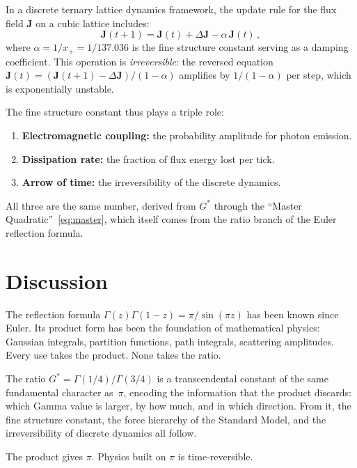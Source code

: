 \documentclass[12pt,reqno]{amsart}
\theoremstyle{definition}
\theoremstyle{remark}
\newcommand{\Gstar}{G^{\!*}}
\begin{document}
In a discrete ternary lattice dynamics framework, the update rule for the flux field $\mathbf{J}$ on a cubic lattice includes:
\begin{equation}
  \mathbf{J}(t+1) = \mathbf{J}(t) + \Delta\mathbf{J} - \alpha\,\mathbf{J}(t)\,,
\end{equation}
where $\alpha = 1/x_+ = 1/137.036$ is the fine structure constant serving as a damping coefficient. This operation is \emph{irreversible}: the reversed equation $\mathbf{J}(t) = (\mathbf{J}(t+1) - \Delta\mathbf{J})/(1-\alpha)$ amplifies by $1/(1-\alpha)$ per step, which is exponentially unstable.

The fine structure constant thus plays a triple role:
\begin{enumerate}[nosep]
  \item \textbf{Electromagnetic coupling:} the probability amplitude for photon emission.
  \item \textbf{Dissipation rate:} the fraction of flux energy lost per tick.
  \item \textbf{Arrow of time:} the irreversibility of the discrete dynamics.
\end{enumerate}
All three are the same number, derived from $\Gstar$ through the ``Master Quadratic''~\eqref{eq:master}, which itself comes from the ratio branch of the Euler reflection formula.

\section{Discussion}

The reflection formula $\Gamma(z)\Gamma(1-z) = \pi/\sin(\pi z)$ has been known since Euler. Its product form has been the foundation of mathematical physics: Gaussian integrals, partition functions, path integrals, scattering amplitudes. Every use takes the product. None takes the ratio.

The ratio $\Gstar = \Gamma(1/4)/\Gamma(3/4)$ is a transcendental constant of the same fundamental character as~$\pi$, encoding the information that the product discards: which Gamma value is larger, by how much, and in which direction. From it, the fine structure constant, the force hierarchy of the Standard Model, and the irreversibility of discrete dynamics all follow.

The product gives $\pi$. Physics built on $\pi$ is time-reversible.
\end{document}
